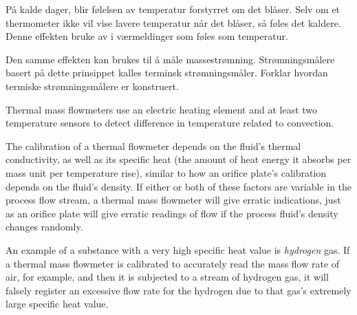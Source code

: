 

På kalde dager, blir følelsen av temperatur forstyrret om det blåser. Selv om et thermometer ikke vil vise lavere temperatur når det blåser, så føles det kaldere. Denne effekten bruke av i værmeldinger som føles som temperatur. 


Den samme effekten kan brukes til å måle massestrømning. Strømningsmålere basert på dette prinsippet kalles terminsk strømningsmåler. Forklar hvordan termiske strømningsmålere er konstruert. 







Thermal mass flowmeters use an electric heating element and at least two temperature sensors to detect difference in temperature related to convection.  

The calibration of a thermal flowmeter depends on the fluid's thermal conductivity, as well as its specific heat (the amount of heat energy it absorbs per mass unit per temperature rise), similar to how an orifice plate's calibration depends on the fluid's density.  If either or both of these factors are variable in the process flow stream, a thermal mass flowmeter will give erratic indications, just as an orifice plate will give erratic readings of flow if the process fluid's density changes randomly.

\vskip 10pt

An example of a substance with a very high specific heat value is {\it hydrogen} gas.  If a thermal mass flowmeter is calibrated to accurately read the mass flow rate of air, for example, and then it is subjected to a stream of hydrogen gas, it will falsely register an excessive flow rate for the hydrogen due to that gas's extremely large specific heat value.










